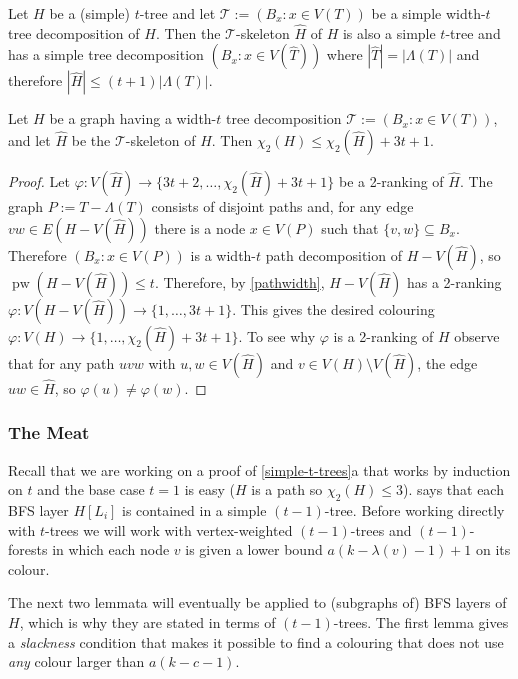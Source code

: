 \documentclass[kpfonts]{patmorin}
\DeclareMathOperator{\pw}{pw}
\newcommand{\trn}{\chi_2}
\theoremstyle{named}
\newcommand{\weirdref}[2]{\cref{#1}#2}
\begin{document}
\begin{obs}\label{skeleton-size}
    Let $H$ be a (simple) $t$-tree and let $\mathcal{T}:=(B_x:x\in V(T))$ be a simple width-$t$ tree decomposition of $H$.  Then the $\mathcal{T}$-skeleton $\hat{H}$ of $H$ is also a simple $t$-tree and has a simple tree decomposition $(B_x:x\in V(\hat{T}))$ where $|\hat{T}|=|\Lambda(T)|$ and therefore $|\hat{H}|\le (t+1)|\Lambda(T)|$.
\end{obs}

\begin{lem}\label{skeleton-colour}
    Let $H$ be a graph having a width-$t$ tree decomposition $\mathcal{T}:=(B_x:x\in V(T))$, and let $\hat{H}$ be the $\mathcal{T}$-skeleton of $H$.  Then $\trn(H)\le \trn(\hat{H}) + 3t+1$.
\end{lem}

\begin{proof}
    Let $\varphi:V(\hat{H})\to \{3t+2,\ldots,\trn(\hat{H})+3t+1\}$ be a 2-ranking of $\hat{H}$. The graph $P:=T-\Lambda(T)$ consists of disjoint paths and, for any edge $vw\in E(H-V(\hat{H}))$ there is a node $x\in V(P)$ such that $\{v,w\}\subseteq B_x$.  Therefore $(B_x:x\in V(P))$ is a width-$t$ path decomposition of $H-V(\hat{H})$, so $\pw(H-V(\hat{H}))\le t$.  Therefore, by \cref{pathwidth}, $H-V(\hat{H})$ has a 2-ranking $\varphi:V(H-V(\hat{H}))\to\{1,\ldots,3t+1\}$.  This gives the desired colouring $\varphi: V(H)\to\{1,\ldots,\trn(\hat{H})+3t+1\}$.  To see why $\varphi$ is a 2-ranking of $H$ observe that for any path $uvw$ with $u,w\in V(\hat{H})$ and $v\in V(H)\setminus V(\hat{H})$, the edge $uw\in\hat{H}$, so $\varphi(u)\neq\varphi(w)$.
\end{proof}

\subsubsection{The Meat}

Recall that we are working on a proof of \weirdref{simple-t-trees}{a} that works by induction on $t$ and the base case $t=1$ is easy ($H$ is a path so $\trn(H)\le 3$).  says that each BFS layer $H[L_i]$ is contained in a simple $(t-1)$-tree.  Before working directly with $t$-trees we will work with vertex-weighted $(t-1)$-trees and $(t-1)$-forests in which each node $v$ is given a lower bound $a(k-\lambda(v)-1)+1$ on its colour.

The next two lemmata will eventually be applied to (subgraphs of) BFS layers of $H$, which is why they are stated in terms of $(t-1)$-trees.  The first lemma gives a \emph{slackness} condition that makes it possible to find a colouring that does not use \emph{any} colour larger than $a(k-c-1)$.
\end{document}
